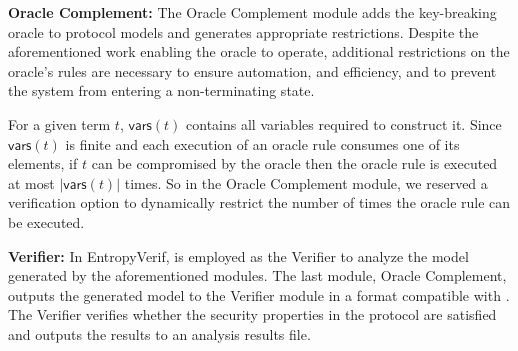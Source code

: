 



\noindent
\textbf{Oracle Complement:} 
The Oracle Complement module adds the key-breaking oracle to protocol models and generates appropriate restrictions.
Despite the aforementioned work enabling the oracle to operate, additional restrictions on the oracle's rules are necessary to ensure automation, and efficiency, and to prevent the system from entering a non-terminating state.

For a given term $t$, $\mathsf{vars}(t)$ contains all variables required to construct it.
Since $\mathsf{vars}(t)$ is finite and each execution of an oracle rule consumes one of its
elements, if $t$ can be compromised by the oracle then the oracle rule is executed at most
$|\mathsf{vars}(t)|$ times.
So in the Oracle Complement module, we reserved a verification option to dynamically restrict the number of times the oracle rule can be executed.

\noindent
\textbf{Verifier:} 
In EntropyVerif, \Tamarin{} is employed as the Verifier to analyze the model generated by the aforementioned modules.
The last module, Oracle Complement, outputs the generated model to the Verifier module in a format compatible with \Tamarin{}. 
The Verifier verifies whether the security properties in the protocol are satisfied and outputs the results to an analysis results file.
